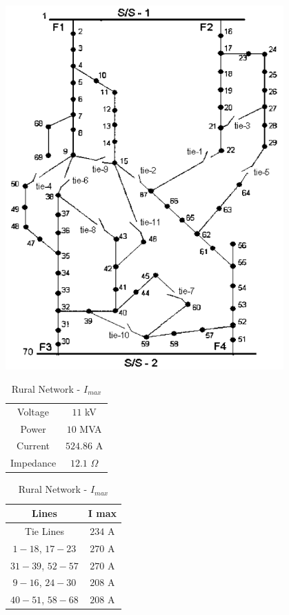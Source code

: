 \begin{table}[!h]
    \begin{minipage}[!h]{.5\textwidth}
	\centering
	\includegraphics[width=0.8\textwidth]{NwImages/Rural_Network}
    \end{minipage}
    \begin{minipage}[h]{.5\textwidth }
    \centering
	\begin{tabular}{cc}
	\hline
	Voltage & $11$ kV\\
	\rowcolor{gray!15}
	Power & $10$ MVA\\
	Current &  $524.86$ A\\
	\rowcolor{gray!15}
	Impedance & $12.1$ $\Omega$\\
	\hline
	\end{tabular}
	\caption{Rural Network - Base Values}

	\vspace*{1 cm}

	\begin{tabular}{cc}
	\rowcolor{gray!25}
	\textbf{Lines} & \textbf{I max}\\
	\hline
	Tie Lines & $234$ A\\
	\rowcolor{gray!15}
	$1-18$, $17-23$ & $270$ A\\
	$31-39$, $52-57$ & $270$ A \\
	\rowcolor{gray!15}
	$9-16$, $24-30$ & $208$ A\\
	$40-51$, $58-68$ & $208$ A\\
	\hline
	\end{tabular}
	\caption{Rural Network - $I_{max}$}
    \end{minipage}%
\end{table}

